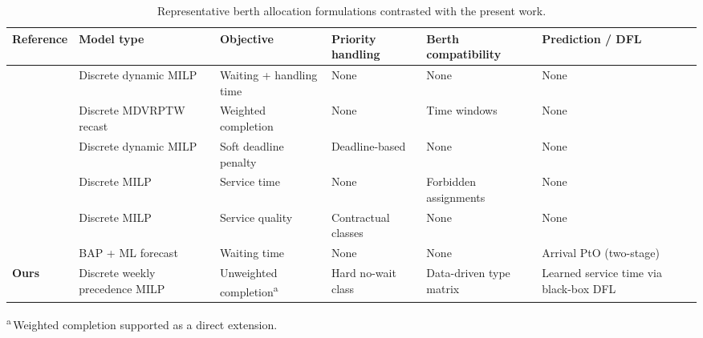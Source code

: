 \begin{table}[htbp]
\centering
\caption{Representative berth allocation formulations contrasted with the present work.}
\label{tab:related}
\small
\begin{tabular}{@{}llllll@{}}
\toprule
Reference & Model type & Objective & Priority handling & Berth compatibility & Prediction / DFL \\
\midrule
\citet{imai2001dynamic} & Discrete dynamic MILP & Waiting + handling time & None & None & None \\
\citet{cordeau2005berth} & Discrete MDVRPTW recast & Weighted completion & None & Time windows & None \\
\citet{golias2007berth} & Discrete dynamic MILP & Soft deadline penalty & Deadline-based & None & None \\
\citet{alzaabi2016berth} & Discrete MILP & Service time & None & Forbidden assignments & None \\
\citet{Ursavas2022PriorityControlBAP} & Discrete MILP & Service quality & Contractual classes & None & None \\
\citet{chu2025integrating} & BAP + ML forecast & Waiting time & None & None & Arrival PtO (two-stage) \\
\textbf{Ours} & Discrete weekly precedence MILP & Unweighted completion\textsuperscript{a} & Hard no-wait class & Data-driven type matrix & Learned service time via black-box DFL \\
\bottomrule
\end{tabular}

\vspace{2pt}
\begin{flushleft}
\footnotesize \textsuperscript{a}\,Weighted completion supported as a direct extension.
\end{flushleft}
\end{table}
